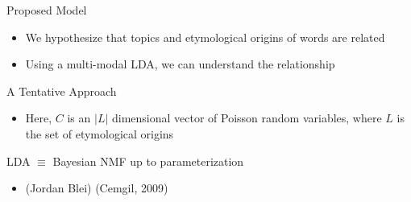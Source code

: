 \documentclass[pdf]{beamer}
\begin{document}
\begin{frame}{Proposed Model}
	\begin{itemize}
		\item	We hypothesize that topics and etymological origins of words are related
		\item Using a multi-modal LDA, we can understand the relationship
	\end{itemize}
\end{frame}

\begin{frame}{A Tentative Approach}
	\begin{itemize}
		  \item Here, $C$ is an $|L|$ dimensional vector of Poisson random variables, where $L$ is the set of etymological origins
	\end{itemize}
\end{frame}

\begin{frame}{LDA $\equiv$ Bayesian NMF up to parameterization }
	
	\begin{itemize}
		\item (Jordan Blei) (Cemgil, 2009)
	\end{itemize}
	
\end{frame}
\end{document}
